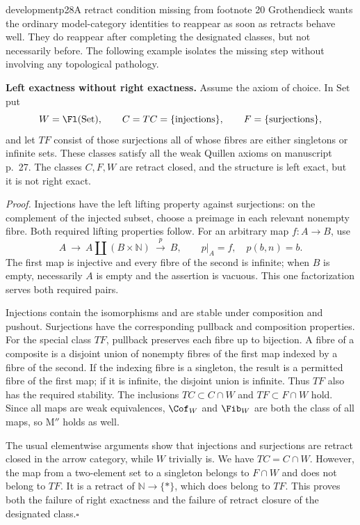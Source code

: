 \begin{dcomment}{development}{p28}{A retract condition missing from footnote 20}
Grothendieck wants the ordinary model-category identities to reappear as soon as retracts behave well. They do reappear after completing the designated classes, but not necessarily before. The following example isolates the missing step without involving any topological pathology.

\noindent\textbf{Left exactness without right exactness.}\ours\quad
Assume the axiom of choice. In $\mathrm{Set}$ put
\[
 W=\Fl(\mathrm{Set}),\qquad C=TC=\{\text{injections}\},
 \qquad F=\{\text{surjections}\},
\]
and let $TF$ consist of those surjections all of whose fibres are either singletons or infinite sets. These classes satisfy all the weak Quillen axioms on manuscript p.~27. The classes $C,F,W$ are retract closed, and the structure is left exact, but it is not right exact.

\emph{Proof.} Injections have the left lifting property against surjections: on the complement of the injected subset, choose a preimage in each relevant nonempty fibre. Both required lifting properties follow. For an arbitrary map $f:A\to B$, use
\[
 A\ \longrightarrow\ A\amalg(B\times\mathbb N)
 \ \xrightarrow{\ p\ }\ B,
 \qquad p|_A=f,\quad p(b,n)=b.
\]
The first map is injective and every fibre of the second is infinite; when $B$ is empty, necessarily $A$ is empty and the assertion is vacuous. This one factorization serves both required pairs.

Injections contain the isomorphisms and are stable under composition and pushout. Surjections have the corresponding pullback and composition properties. For the special class $TF$, pullback preserves each fibre up to bijection. A fibre of a composite is a disjoint union of nonempty fibres of the first map indexed by a fibre of the second. If the indexing fibre is a singleton, the result is a permitted fibre of the first map; if it is infinite, the disjoint union is infinite. Thus $TF$ also has the required stability. The inclusions $TC\subset C\cap W$ and $TF\subset F\cap W$ hold. Since all maps are weak equivalences, $\Cof_W$ and $\Fib_W$ are both the class of all maps, so $\text{M}''$ holds as well.

The usual elementwise arguments show that injections and surjections are retract closed in the arrow category, while $W$ trivially is. We have $TC=C\cap W$. However, the map from a two-element set to a singleton belongs to $F\cap W$ and does not belong to $TF$. It is a retract of $\mathbb N\to\{*\}$, which does belong to $TF$. This proves both the failure of right exactness and the failure of retract closure of the designated class.\hfill$\square$


\end{dcomment}
